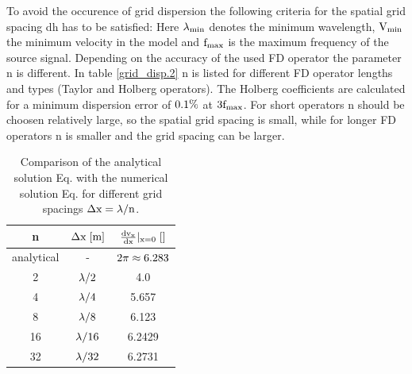 To avoid the occurence of grid dispersion the following criteria for the spatial grid spacing dh has to be satisfied:
Here $\rm{\lambda_{min}}$ denotes the minimum wavelength, $\rm{V_{min}}$ the minimum velocity in the model and $\rm{f_{max}}$ is the maximum
frequency of the source signal.  
Depending on the accuracy of the used FD operator the parameter n is different.  In table \ref{grid_disp.2} n is listed for different FD operator lengths 
and types (Taylor and Holberg operators). The Holberg coefficients are calculated for a minimum dispersion error of $\rm{0.1\%}$ at $\rm{3 f_{max}}$. For short operators n should be choosen relatively large, so the spatial grid spacing is small, while for longer FD operators n is smaller and the grid spacing can be larger. 
\begin{table}[hbt]
\begin{center}
\begin{tabular}{ccc}\hline \hline
n &  $\rm{\Delta x\; [m]}$ & $\rm{\frac{d v_x}{d x}|_{x=0}\; []}$ \\ \hline 
analytical & - & $\rm{2\pi \approx 6.283}$ \\ 
2 & $\rm{\lambda/2}$ & 4.0 \\ 
4 & $\rm{\lambda/4}$ & 5.657 \\ 
8 & $\rm{\lambda/8}$ & 6.123 \\ 
16 & $\rm{\lambda/16}$ & 6.2429 \\ 
32 & $\rm{\lambda/32}$ & 6.2731\\ \hline \hline
\end{tabular}
\caption{\label{grid_disp.1} Comparison of the analytical solution Eq.  with the numerical solution Eq.  
for different grid spacings $\rm{\Delta x = \lambda /n}$.}
\end{center}
\end{table}
 
